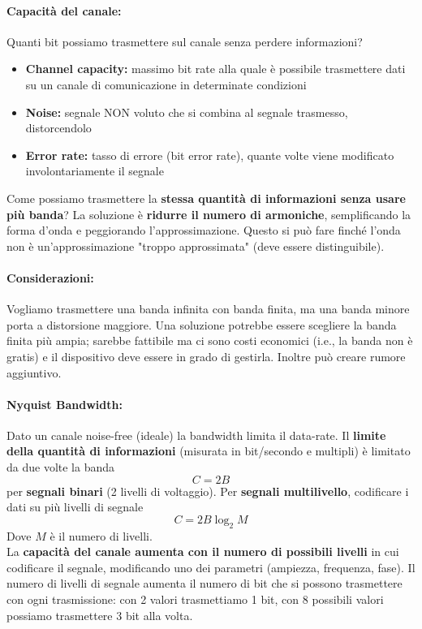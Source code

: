 \paragraph{Capacità del canale:} Quanti bit possiamo trasmettere sul canale senza perdere informazioni?
\begin{itemize}
	\item \textbf{Channel capacity:} massimo bit rate alla quale è possibile trasmettere dati su un canale di comunicazione in determinate condizioni
	\item \textbf{Noise:} segnale NON voluto che si combina al segnale trasmesso, distorcendolo
	\item \textbf{Error rate:} tasso di errore (bit error rate), quante volte viene modificato involontariamente il segnale
\end{itemize}

Come possiamo trasmettere la \textbf{stessa quantità di informazioni senza usare più banda}? La soluzione è \textbf{ridurre il numero di armoniche}, semplificando la forma d'onda e peggiorando l'approssimazione. Questo si può fare finché l'onda non è un'approssimazione "troppo approssimata" (deve essere distinguibile).\\

\paragraph{Considerazioni:} Vogliamo trasmettere una banda infinita con banda finita, ma una banda minore porta a distorsione maggiore. Una soluzione potrebbe essere scegliere la banda finita più ampia; sarebbe fattibile ma ci sono costi economici (i.e., la banda non è gratis) e il dispositivo deve essere in grado di gestirla. Inoltre può creare rumore aggiuntivo. \\

\paragraph{Nyquist Bandwidth:} Dato un canale noise-free (ideale) la bandwidth limita il data-rate. Il \textbf{limite della quantità di informazioni} (misurata in bit/secondo e multipli) è limitato da due volte la banda
$$ C = 2B $$
per \textbf{segnali binari} (2 livelli di voltaggio). Per \textbf{segnali multilivello}, codificare i dati su più livelli di segnale
$$ C = 2B \log_2 M $$
Dove $M$ è il numero di livelli.\\

La \textbf{capacità del canale aumenta con il numero di possibili livelli} in cui codificare il segnale, modificando uno dei parametri (ampiezza, frequenza, fase). Il numero di livelli di segnale aumenta il numero di bit che si possono trasmettere con ogni trasmissione: con 2 valori trasmettiamo 1 bit, con 8 possibili valori possiamo trasmettere 3 bit alla volta. \\

